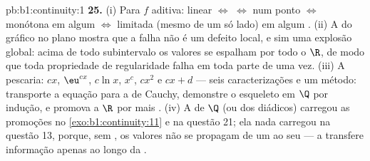 \begin{solution}{pb:b1:continuity:1}
\textbf{25.} (i) Para $f$ aditiva: linear $\iff$ 
$\iff$  num ponto $\iff$ monótona em algum 
$\iff$ limitada (mesmo de um só lado) em algum . (ii) A
 do gráfico no plano mostra que a falha não é um defeito
local, e sim uma explosão global: acima de todo subintervalo os
valores se espalham por todo o $\R$, de modo que toda propriedade de
regularidade falha em toda parte de uma vez. (iii) A pescaria: $cx$,
$\eu^{cx}$, $c\ln x$, $x^c$, $cx^2$ e $cx + d$ --- seis
caracterizações e um método: transporte a equação para a de Cauchy,
demonstre o esqueleto em $\Q$ por indução, e promova a $\R$ por
 mais . (iv) A  de $\Q$ (ou dos diádicos)
carregou as promoções no \cref{exo:b1:continuity:11} e na questão 21; ela
nada carregou na questão 13, porque, sem , os
valores não se propagam de um   ao seu  ---
a  transfere informação apenas ao longo da .
\end{solution}
